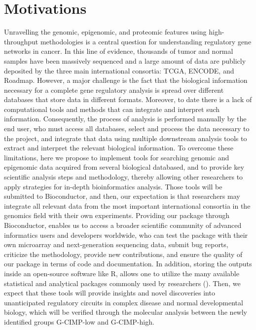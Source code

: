 \section{Motivations}


Unravelling the genomic, epigenomic, and proteomic features using high-throughput methodologies is a central question for understanding regulatory gene networks in cancer. In this line of evidence, thousands of tumor and normal samples have been massively sequenced and a large amount of data are publicly deposited by the three main international consortia: TCGA, ENCODE, and Roadmap. However, a major challenge is the fact that the biological information necessary for a complete gene regulatory analysis is spread over different databases that store data in different formats. Moreover, to date there is a lack of  computational tools and methods that can integrate and interpret such information. Consequently, the process of analysis is performed manually by the end user, who must access all databases, select and process the data necessary to the project, and integrate that data using multiple downstream analysis tools to extract and interpret the relevant biological information.
To overcome these limitations, here we propose to implement tools for searching genomic and epigenomic data acquired from several biological databased, and to provide key scientific analysis steps and methodology, thereby allowing other researchers to apply  strategies for in-depth bioinformatics analysis. Those tools will be submitted to Bioconductor, and then, our expectation is that researchers may integrate all relevant data from the most important international consortia in the genomics field with their own experiments. Providing our package through Bioconductor, enables us to access a broader scientific community of advanced informatics users and developers worldwide, who can test the package with their own microarray and next-generation sequencing data, submit bug reports, criticize the methodology, provide new contributions, and ensure the quality of our package in terms of code and documentation.  In addition, storing the outputs inside an open-source software like R, allows one to utilize the many available statistical and analytical packages commonly used by researchers (\citealp{creditcode}). Then, we expect that these tools will provide insights and novel discoveries into unanticipated regulatory circuits in complex disease and normal developmental biology, which will be verified through the molecular analysis between the newly identified groups G-CIMP-low and G-CIMP-high.



